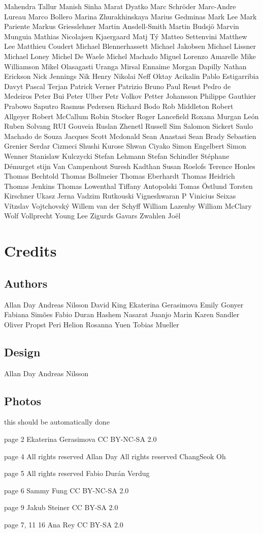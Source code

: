 \documentclass{scrreprt}
\begin{document}
Mahendra Tallur
Manish Sinha
Marat Dyatko
Marc Schröder
Marc-Andre Lureau
Marco Bollero
Marina Zhurakhinskaya
Marius Gedminas
Mark Lee
Mark Pariente
Markus Griesslehner
Martin Ansdell-Smith
Martin Budsjö
Marvin Munguia
Mathias Nicolajsen Kjaergaard
Matj Tý
Matteo Settenvini
Matthew Lee
Matthieu Coudert
Michael Blennerhassett
Michael Jakobsen
Michael Lissner
Michael Loney
Michel De Waele
Michel Machado
Miguel Lorenzo Amarelle
Mike Williamson
Mikel Olasagasti Uranga
Mirsal Ennaime
Morgan Dapilly
Nathan Erickson
Nick Jennings
Nik Henry
Nikolai Neff
Oktay Acikalin
Pablo Estigarribia Davyt
Pascal Terjan
Patrick Verner
Patrizio Bruno
Paul Reust
Pedro de Medeiros
Peter Bui
Peter Ulber
Petr Volkov
Petter Johansson
Philippe Gauthier
Prabowo Saputro
Rasmus Pedersen
Richard Bodo
Rob Middleton
Robert Allgeyer
Robert McCallum
Robin Stocker
Roger Lancefield
Roxana Murgan León
Ruben Solvang
RUI Gouveia
Ruslan Zhenetl
Russell Sim
Salomon Sickert
Saulo Machado de Souza Jacques
Scott Mcdonald
Sean Anastasi
Sean Brady
Sebastien Grenier
Serdar Cizmeci
Shushi Kurose
Shwan Ciyako
Simon Engelbert
Simon Wenner
Stanislaw Kulczycki
Stefan Lehmann
Stefan Schindler
Stéphane Démurget
stijn Van Campenhout
Suresh Kadthan
Susan Roelofs
Terence Honles
Thomas Bechtold
Thomas Bollmeier
Thomas Eberhardt
Thomas Heidrich
Thomas Jenkins
Thomas Lowenthal
Tiffany Antopolski
Tomas Östlund
Torsten Kirschner
Ukasz Jerna
Vadzim Rutkouski
Vigneshwaran P
Vinicius Seixas
Vítzslav Vojtchovský
Willem van der Schyff
William Lazenby
William McClary
Wolf Vollprecht
Young Lee
Zigurds Gavars
Zwahlen Joël



\section{Credits}

\subsection{Authors}

Allan Day
Andreas Nilsson
David King
Ekaterina Gerasimova
Emily Gonyer
Fabiana Simões
Fabio Duran 
Hashem Nasarat
Juanjo Marin
Karen Sandler
Oliver Propst
Peri Helion
Rosanna Yuen
Tobias Mueller



\subsection{Design}
Allan Day
Andreas Nilsson

\subsection{Photos}

this should be automatically done

page 2
Ekaterina Gerasimova CC BY-NC-SA 2.0

page 4
All rights reserved Allan Day
All rights reserved ChangSeok Oh

page 5
All rights reserved Fabio Durán Verdug

page 6
Sammy Fung CC BY-NC-SA 2.0

page 9
Jakub Steiner CC BY-SA 2.0

page 7, 11 16
Ana Rey CC BY-SA 2.0
\end{document}
